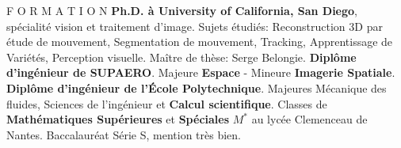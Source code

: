 




\begin{rubric}{F O R M A T I O N}
\entry*[2004--2009]%
  \textbf{Ph.D. \`{a} University of California, San Diego}, sp\'{e}cialit\'{e} vision et traitement d'image. Sujets 
\'{e}tudi\'{e}s: Reconstruction 3D par \'{e}tude de mouvement, Segmentation de mouvement, Tracking, Apprentissage de 
Vari\'{e}t\'{e}s, Perception visuelle. \newline
  Ma\^{i}tre de th\`{e}se: Serge Belongie.
\entry*[2001--2003]%
  \textbf{Dipl\^{o}me d'ing\'{e}nieur de SUPAERO}.
  Majeure \textbf{Espace} - Mineure \textbf{Imagerie Spatiale}.
\entry*[1998--2001]%
  \textbf{Dipl\^{o}me d'ing\'{e}nieur de l'\'{E}cole Polytechnique}. Majeures M\'{e}canique des fluides, Sciences de l'ing\'{e}nieur et \textbf{Calcul scientifique}.
\entry*[1996--1998]%
  Classes de \textbf{Math\'{e}matiques Sup\'{e}rieures} et \textbf{Sp\'{e}ciales} $M^*$ au lyc\'{e}e Clemenceau de Nantes.
\entry*[1996]%
  Baccalaur\'{e}at S\'{e}rie S, mention tr\`{e}s bien.
\end{rubric}



